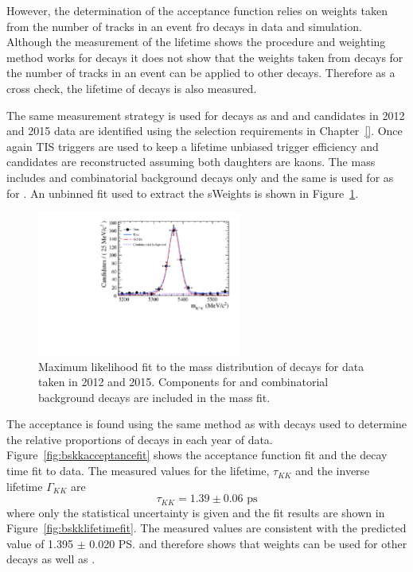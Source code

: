 However, the determination of the \bsmumu acceptance function relies on weights taken from the number of tracks in an event fro \bdkpi decays in data and simulation. Although the measurement of the \bdkpi lifetime shows the procedure and weighting method works for \bdkpi decays it does not show that the weights taken from \bdkpi decays for the number of tracks in an event can be applied to other decays. Therefore as a cross check, the lifetime of \bskk decays is also measured. 

The same measurement strategy is used for \bskk decays as \bsmumu and \bdkpi and candidates in 2012 and 2015 data are identified using the selection requirements in Chapter~\ref{}. Once again TIS triggers are used to keep a lifetime unbiased trigger efficiency and candidates are reconstructed assuming both daughters are kaons. The mass \pdf includes \bskk and combinatorial background decays only and the same \pdf is used for \bskk as for \bskpi. An unbinned \ml fit used to extract the sWeights is shown in Figure~\ref{fig:bskkmassfit}. 

\begin{figure}[htbp]
\centering
  \includegraphics[width=0.6\textwidth]{./Figs/LifetimeSystematics/Bs2KK_mass_fit.pdf}
\caption{Maximum likelihood fit to the mass distribution of \bskk decays for data taken in 2012 and 2015. Components for \bskk and combinatorial background decays are included in the mass fit. }
\label{fig:bskkmassfit}
\end{figure}


The \bskk acceptance is found using the same method as \bsmumu with \bsjpisphi decays used to determine the relative proportions of decays in each year of data. Figure~\ref{fig:bskkacceptancefit} shows the acceptance function fit and the decay time fit to data. The measured values for the lifetime, $\tau_{KK}$ and the inverse lifetime $\Gamma_{KK}$ are
\begin{equation}
\tau_{KK} = 1.39 \pm 0.06  \text{ ps} 
\end{equation}
where only the statistical uncertainty is given and the fit results are shown in Figure~\ref{fig:bskklifetimefit}. The measured values are consistent with the predicted value of 1.395 $\pm$ 0.020 \ps \cite{} and therefore shows that \bdkpi weights can be used for other decays as well as \bdkpi. 


